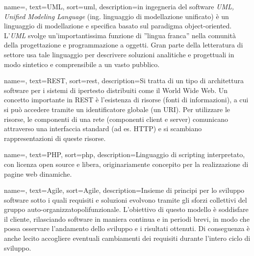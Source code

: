 
\renewcommand{\acronymname}{Acronimi e abbreviazioni}



    




{
    name=,
    text=UML,
    sort=uml,
    description={in ingegneria del software \emph{UML, Unified Modeling Language} (ing. linguaggio di modellazione unificato) è un linguaggio di modellazione e specifica basato sul paradigma object-oriented. L'\emph{UML} svolge un'importantissima funzione di ''lingua franca'' nella comunità della progettazione e programmazione a oggetti. Gran parte della letteratura di settore usa tale linguaggio per descrivere soluzioni analitiche e progettuali in modo sintetico e comprensibile a un vasto pubblico.}
}

{
	name=,
	text=REST,
	sort=rest,
	description={Si tratta di un tipo di architettura software per i sistemi di ipertesto distribuiti come il World Wide Web. Un concetto importante in REST è l’esistenza di risorse (fonti di informazioni), a cui si può accedere tramite un identificatore globale (un URI). Per utilizzare le risorse, le componenti di una rete (componenti client e server) comunicano attraverso una interfaccia standard (ad es. HTTP) e si scambiano rappresentazioni di queste risorse.}
}

{
	name=,
	text=PHP,
	sort=php,
	description={Linguaggio di scripting interpretato, con licenza open source e libera, originariamente concepito per la realizzazione di pagine web dinamiche.}
}

{
	name=,
	text=Agile,
	sort=Agile,
	description={Insieme di principi per lo sviluppo software sotto i quali requisiti e soluzioni
		evolvono tramite gli sforzi collettivi del gruppo auto-organizzatopolifunzionale. L’obiettivo di questo modello è soddisfare il cliente, rilasciando software in
		maniera continua e in periodi brevi, in modo che possa osservare l’andamento dello
		sviluppo e i risultati ottenuti. Di conseguenza è anche lecito accogliere eventuali
		cambiamenti dei requisiti durante l’intero ciclo di sviluppo.}
}

